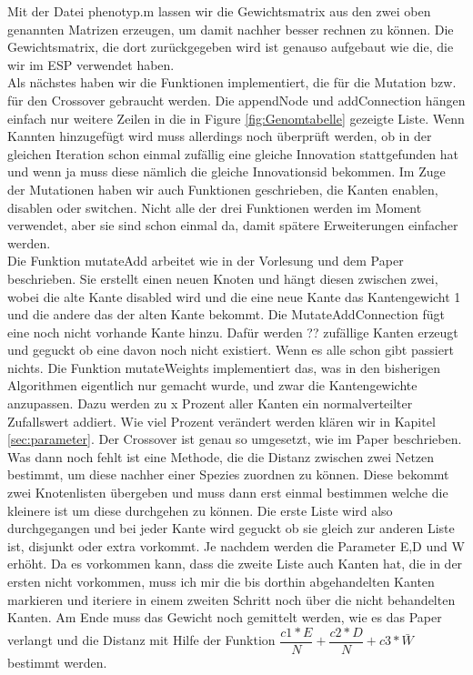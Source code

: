\documentclass{hbrs-ecta-report}
\begin{document}
Mit der Datei phenotyp.m lassen wir die Gewichtsmatrix aus den zwei oben genannten Matrizen erzeugen, um damit nachher besser rechnen zu können. Die Gewichtsmatrix, die dort zurückgegeben wird ist genauso aufgebaut wie die, die wir im ESP verwendet haben.\\
Als nächstes haben wir die Funktionen implementiert, die für die Mutation bzw. für den Crossover gebraucht werden. Die appendNode und addConnection hängen einfach nur weitere Zeilen in die in Figure \ref{fig:Genomtabelle} gezeigte Liste. Wenn Kannten hinzugefügt wird muss allerdings noch überprüft werden, ob in der gleichen Iteration schon einmal zufällig eine gleiche Innovation stattgefunden hat und wenn ja muss diese nämlich die gleiche Innovationsid bekommen. Im Zuge der Mutationen haben wir auch Funktionen geschrieben, die Kanten enablen, disablen oder switchen. Nicht alle der drei Funktionen werden im Moment verwendet, aber sie sind schon einmal da, damit spätere Erweiterungen einfacher werden.\\ 
Die Funktion mutateAdd arbeitet wie in der Vorlesung und dem Paper beschrieben. Sie erstellt einen neuen Knoten und hängt diesen zwischen zwei, wobei die alte Kante disabled wird und die eine neue Kante das Kantengewicht 1 und die andere das der alten Kante bekommt.
Die MutateAddConnection fügt eine noch nicht vorhande Kante hinzu. Dafür werden ?? zufällige Kanten erzeugt und geguckt ob eine davon noch nicht existiert. Wenn es alle schon gibt passiert nichts.
Die Funktion mutateWeights implementiert das, was in den bisherigen Algorithmen eigentlich nur gemacht wurde, und zwar die Kantengewichte anzupassen. Dazu werden zu x Prozent aller Kanten ein normalverteilter Zufallswert addiert. Wie viel Prozent verändert werden klären wir in Kapitel \ref{sec:parameter}. Der Crossover ist genau so umgesetzt, wie im Paper beschrieben.\\

Was dann noch fehlt ist eine Methode, die die Distanz zwischen zwei Netzen bestimmt, um diese nachher einer Spezies zuordnen zu können. Diese bekommt zwei Knotenlisten übergeben und muss dann erst einmal bestimmen welche die kleinere ist um diese durchgehen zu können. Die erste Liste wird also durchgegangen und bei jeder Kante wird geguckt ob sie gleich zur anderen Liste ist, disjunkt oder extra vorkommt. Je nachdem werden die Parameter E,D und W erhöht. Da es vorkommen kann, dass die zweite Liste auch Kanten hat, die in der ersten nicht vorkommen, muss ich mir die bis dorthin abgehandelten Kanten markieren und iteriere in einem zweiten Schritt noch über die nicht behandelten Kanten. Am Ende muss das Gewicht noch gemittelt werden, wie es das Paper verlangt und die Distanz mit Hilfe der Funktion $ \dfrac{c1*E}{N}+\dfrac{c2*D}{N}+c3*\bar{W}$ bestimmt werden.\\
\end{document}
